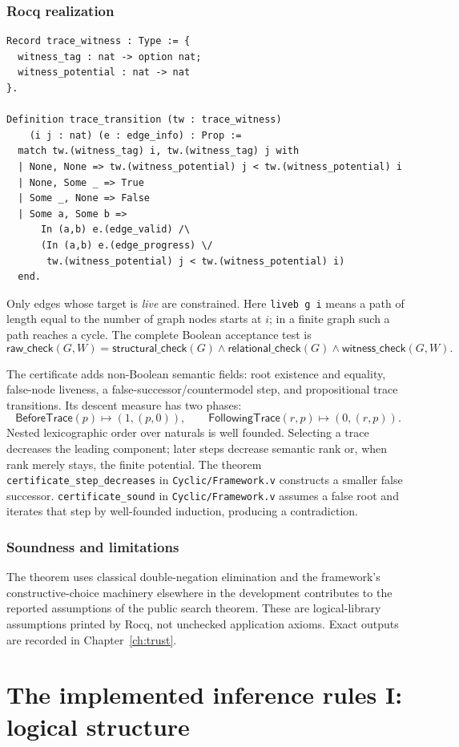 \documentclass[11pt,oneside]{book}
\DeclareRobustCommand{\code}[1]{\nolinkurl{#1}}
\DeclareRobustCommand{\file}[1]{\nolinkurl{#1}}
\newcommand{\src}[2]{\code{#2} in \file{#1}}
\newcommand{\rocqreal}{\subsection*{Rocq realization}}
\newcommand{\soundlim}{\subsection*{Soundness and limitations}}
\begin{document}
\rocqreal

\begin{lstlisting}[caption={Finite trace-routing data and its transition relation.}]
Record trace_witness : Type := {
  witness_tag : nat -> option nat;
  witness_potential : nat -> nat
}.

Definition trace_transition (tw : trace_witness)
    (i j : nat) (e : edge_info) : Prop :=
  match tw.(witness_tag) i, tw.(witness_tag) j with
  | None, None => tw.(witness_potential) j < tw.(witness_potential) i
  | None, Some _ => True
  | Some _, None => False
  | Some a, Some b =>
      In (a,b) e.(edge_valid) /\
      (In (a,b) e.(edge_progress) \/
       tw.(witness_potential) j < tw.(witness_potential) i)
  end.
\end{lstlisting}
Only edges whose target is \emph{live} are constrained.  Here
\code{liveb g i} means a path of length equal to the number of graph nodes
starts at \(i\); in a finite graph such a path reaches a cycle.  The complete
Boolean acceptance test is
\[
 \mathsf{raw\_check}(G,W)=
 \mathsf{structural\_check}(G)\land
 \mathsf{relational\_check}(G)\land
 \mathsf{witness\_check}(G,W).
\]

The certificate adds non-Boolean semantic fields: root existence and equality,
false-node liveness, a false-successor/countermodel step, and propositional
trace transitions.  Its descent measure has two phases:
\[
 \mathsf{BeforeTrace}(p)\mapsto(1,(p,0)),\qquad
 \mathsf{FollowingTrace}(r,p)\mapsto(0,(r,p)).
\]
Nested lexicographic order over naturals is well founded.  Selecting a trace
decreases the leading component; later steps decrease semantic rank or, when
rank merely stays, the finite potential.  The theorem
\src{Cyclic/Framework.v}{certificate_step_decreases} constructs a smaller
false successor.  \src{Cyclic/Framework.v}{certificate_sound} assumes a false
root and iterates that step by well-founded induction, producing a
contradiction.

\soundlim

The theorem uses classical double-negation elimination and the framework's
constructive-choice machinery elsewhere in the development contributes to the
reported assumptions of the public search theorem.  These are logical-library
assumptions printed by Rocq, not unchecked application axioms.  Exact outputs
are recorded in Chapter~\ref{ch:trust}.

\chapter{The implemented inference rules I: logical structure}
\label{ch:rules-logic}
\end{document}
